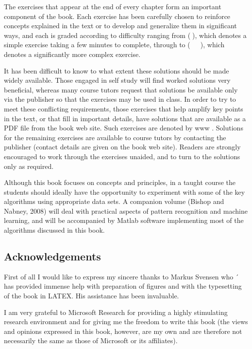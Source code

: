 \documentclass[
  10
]{article}
\begin{document}
The exercises that appear at the end of every chapter form an important
component of the book. Each exercise has been carefully chosen to
reinforce concepts explained in the text or to develop and generalize
them in significant ways, and each is graded according to difficulty
ranging from (), which denotes a simple exercise taking a few minutes to
complete, through to (  ), which denotes a significantly more complex
exercise.

It has been difficult to know to what extent these solutions should be
made widely available. Those engaged in self study will find worked
solutions very beneficial, whereas many course tutors request that
solutions be available only via the publisher so that the exercises may
be used in class. In order to try to meet these conflicting
requirements, those exercises that help amplify key points in the text,
or that fill in important details, have solutions that are available as
a PDF file from the book web site. Such exercises are denoted by www .
Solutions for the remaining exercises are available to course tutors by
contacting the publisher (contact details are given on the book web
site). Readers are strongly encouraged to work through the exercises
unaided, and to turn to the solutions only as required.

Although this book focuses on concepts and principles, in a taught
course the students should ideally have the opportunity to experiment
with some of the key algorithms using appropriate data sets. A companion
volume (Bishop and Nabney, 2008) will deal with practical aspects of
pattern recognition and machine learning, and will be accompanied by
Matlab software implementing most of the algorithms discussed in this
book.

\subsection{Acknowledgements}\label{acknowledgements}

First of all I would like to express my sincere thanks to Markus Svensen
who ´ has provided immense help with preparation of figures and with the
typesetting of the book in LATEX. His assistance has been invaluable.

I am very grateful to Microsoft Research for providing a highly
stimulating research environment and for giving me the freedom to write
this book (the views and opinions expressed in this book, however, are
my own and are therefore not necessarily the same as those of Microsoft
or its affiliates).
\end{document}
